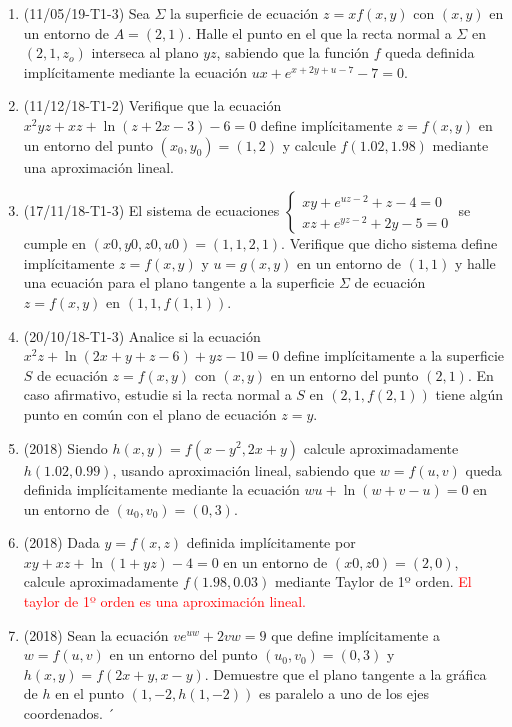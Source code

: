 \documentclass[12pt,a4paper]{article}
\newcommand{\red}[1]{\textcolor{red}{#1}}
\begin{document}
\begin{enumerate}
	\item (11/05/19-T1-3) Sea $\Sigma$ la superficie de ecuación $z = x f ( x , y )$ con $( x , y )$ en un entorno de $A = ( 2 , 1 ) $. Halle el punto en el que la recta normal a $\Sigma$ en $ ( 2 , 1 , z_o ) $ interseca al plano $ yz $, sabiendo que la función $f$ queda definida implícitamente mediante la ecuación $u x + e^{x + 2 y + u - 7} - 7 = 0 $.
	 
	\item (11/12/18-T1-2) Verifique que la ecuación $ x^2 y z + x z + \ln ( z + 2 x - 3 ) - 6 = 0 $ define implícitamente $z = f ( x , y )$ en un entorno del punto $( x_0 , y_0 ) = ( 1 , 2 )$ y calcule $f ( 1 . 02 , 1 . 98 )$ mediante una aproximación lineal.
	
	\item (17/11/18-T1-3) El sistema de ecuaciones $\begin{cases}
		x y + e^{u z - 2} + z  - 4 = 0 \\
		x z + e^{y z - 2} + 2y - 5 = 0
	\end{cases}$ se cumple en $( x 0 , y 0 , z 0 , u 0 ) = ( 1 , 1 , 2 , 1 ) $. Verifique que dicho sistema define implícitamente $z = f ( x , y )$ y $u = g ( x , y )$ en un entorno de $( 1 , 1 )$	y halle una ecuación para el plano tangente a la superficie $\Sigma$ de ecuación $z = f ( x , y )$ en $( 1 , 1 , f ( 1 , 1 )) $.
	
	\item (20/10/18-T1-3) Analice si la ecuación $x^2 z + \ln( 2 x + y + z - 6 ) + y z - 10 = 0$ define implícitamente a la superficie $S$ de ecuación $z = f ( x , y )$ con $( x , y )$ en un entorno del punto $( 2 , 1 )$. En caso afirmativo, estudie si la recta normal a $S$ en $( 2 , 1 , f ( 2 , 1 ))$ tiene algún punto en común con el plano de ecuación $z = y $.
	
	\item (2018) Siendo $h(x, y) = f(x - y^2 , 2 x + y)$ calcule aproximadamente $h(1.02, 0.99)$, usando aproximación lineal, sabiendo que $w = f(u, v)$ queda definida implícitamente mediante la ecuación $w u + \ln(w + v - u) = 0$ en un entorno de $(u_0 , v_0 ) = (0, 3)$.
	
	\item (2018) Dada $y = f(x, z)$ definida implícitamente por $x y + x z + \ln(1 + y z) - 4 = 0$ en un entorno	de $(x 0 , z 0 ) = (2, 0) $, calcule aproximadamente $f(1.98, 0.03)$ mediante Taylor de 1º orden. \red{El taylor de 1º orden es una aproximación lineal.}
	
	\item (2018) Sean la ecuación $v e^{u w} + 2 v w = 9$ que define implícitamente a $w = f(u, v)$ en un entorno del punto $(u_0 , v_0) = (0, 3)$ y $h(x, y) = f(2 x + y , x - y) $. Demuestre que el plano tangente a la gráfica de $h$ en el punto $(1, -2, h(1, -2))$ es paralelo a uno de los ejes coordenados.
´
\end{enumerate}
\end{document}
